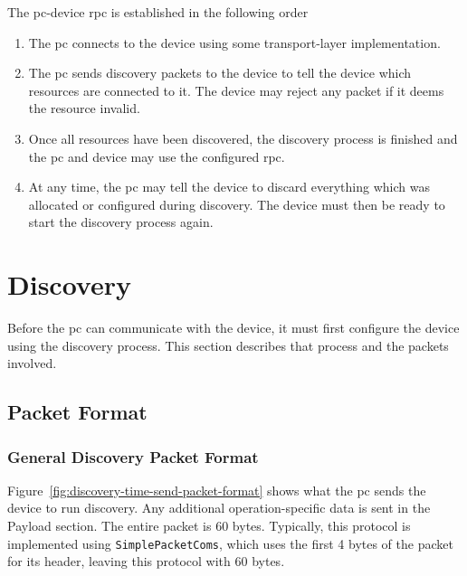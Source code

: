 \documentclass{article}
\begin{document}
The \gls{pc}-\gls{device} \gls{rpc} is established in the following order
\begin{enumerate}
    \item The \gls{pc} connects to the \gls{device} using some \gls{transport-layer} implementation.
    
    \item The \gls{pc} sends \gls{discovery} packets to the \gls{device} to tell the \gls{device} which
    \glspl{resource} are connected to it. The \gls{device} may reject any packet if it deems the
    \gls{resource} invalid.
    
    \item Once all \glspl{resource} have been discovered, the \gls{discovery} process is finished and the
    \gls{pc} and \gls{device} may use the configured \gls{rpc}.

    \item At any time, the \gls{pc} may tell the \gls{device} to discard everything which was
    allocated or configured during \gls{discovery}. The \gls{device} must then be ready to start the
    \gls{discovery} process again.
\end{enumerate}

\clearpage
\tableofcontents

\clearpage
\section{Discovery}

Before the \gls{pc} can communicate with the \gls{device}, it must first configure the \gls{device}
using the \gls{discovery} process. This section describes that process and the packets involved.

\subsection{Packet Format}
\subsubsection{General Discovery Packet Format}

Figure~\ref{fig:discovery-time-send-packet-format} shows what the \gls{pc} sends the \gls{device} to
run \gls{discovery}. Any additional \gls{operation}-specific data is sent in the Payload section.
The entire packet is 60 bytes. Typically, this protocol is implemented using
\texttt{SimplePacketComs}, which uses the first 4 bytes of the packet for its header, leaving this
protocol with 60 bytes.
\end{document}
